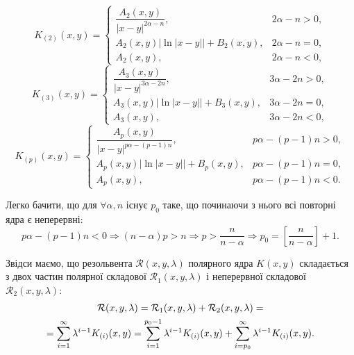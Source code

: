 \begin{equation}
	\label{eq:1.25}
	K_{(2)}(x, y) = \begin{cases}
		\dfrac{A_2(x, y)}{|x - y|^{2\alpha - n}}, & 2\alpha - n > 0, \\
		A_2(x, y) |\ln|x - y|| + B_2(x, y), & 2\alpha - n = 0, \\
		A_2(x, y), & 2\alpha - n < 0,
	\end{cases}
\end{equation}
\begin{equation}
	\label{eq:1.26}
	K_{(3)}(x, y) = \begin{cases}
		\dfrac{A_3(x, y)}{|x - y|^{3\alpha - 2n}}, & 3\alpha - 2n > 0, \\
		A_3(x, y) |\ln|x - y|| + B_3(x, y), & 3\alpha - 2n = 0, \\
		A_3(x, y), & 3\alpha - 2n < 0,
	\end{cases}
\end{equation}
\begin{equation}
	\label{eq:1.27}
	K_{(p)}(x, y) = \begin{cases}
		\dfrac{A_p(x, y)}{|x - y|^{p\alpha - (p-1)n}}, & p\alpha - (p - 1)n > 0, \\
		A_p(x, y) |\ln|x - y|| + B_p(x, y), & p\alpha - (p - 1)n = 0, \\
		A_p(x, y), & p\alpha - (p - 1)n < 0.
	\end{cases}
\end{equation}

Легко бачити, що для $\forall \alpha, n$ існує $p_0$ таке, що починаючи з нього всі повторні ядра є неперервні:
\begin{equation}
	\label{eq:1.28}
	p \alpha - (p - 1) n < 0 \Rightarrow (n - \alpha) p > n \Rightarrow p > \dfrac{n}{n - \alpha} \Rightarrow p_0 = \left[ \dfrac{n}{n - \alpha} \right] + 1.
\end{equation}

Звідси маємо, що резольвента $\mathcal{R}(x, y, \lambda)$ полярного ядра $K(x, y)$ складається з двох частин полярної складової $\mathcal{R}_1(x, y, \lambda)$ і неперервної складової $\mathcal{R}_2(x, y, \lambda)$:
\begin{multline}
	\label{eq:1.29}
	\mathcal{R}(x, y, \lambda) = \mathcal{R}_1(x, y, \lambda) + \mathcal{R}_2(x, y, \lambda) = \\
	= \displaystyle\sum\limits_{i = 1}^\infty \lambda^{i - 1} K_{(i)}(x, y) = \displaystyle\sum\limits_{i = 1}^{p_0 - 1} \lambda^{i - 1} K_{(i)}(x, y) + \displaystyle\sum\limits_{i = p_0}^\infty \lambda^{i - 1} K_{(i)}(x, y).
\end{multline}

